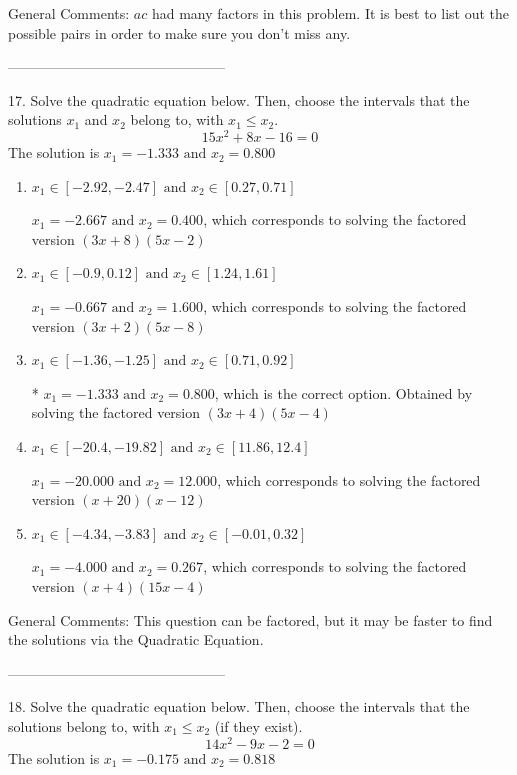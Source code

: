 \documentclass{article}[14pt]
\begin{document}
General Comments: $ac$ had many factors in this problem. It is best to list out the possible pairs in order to make sure you don't miss any.

-----------------------------------------------

17. Solve the quadratic equation below. Then, choose the intervals that the solutions $x_1$ and $x_2$ belong to, with $x_1 \leq x_2$.
$$ 15x^{2} +8 x -16 = 0 $$ 
The solution is $ x_1 = -1.333 \text{ and } x_2 = 0.800 $ 

\begin{enumerate}[label=\Alph*.] 
\item $ x_1 \in [-2.92, -2.47] \text{ and } x_2 \in [0.27, 0.71] $ 

 $x_1 = -2.667 \text{ and } x_2 = 0.400$, which corresponds to solving the factored version $(3x + 8)(5x -2)$ 
\item $ x_1 \in [-0.9, 0.12] \text{ and } x_2 \in [1.24, 1.61] $ 

 $x_1 = -0.667 \text{ and } x_2 = 1.600$, which corresponds to solving the factored version $(3x + 2)(5x -8)$ 
\item $ x_1 \in [-1.36, -1.25] \text{ and } x_2 \in [0.71, 0.92] $ 

 * $x_1 = -1.333 \text{ and } x_2 = 0.800$, which is the correct option. Obtained by solving the factored version $(3x + 4)(5x -4)$ 
\item $ x_1 \in [-20.4, -19.82] \text{ and } x_2 \in [11.86, 12.4] $ 

 $x_1 = -20.000 \text{ and } x_2 = 12.000$, which corresponds to solving the factored version $(x + 20)(x -12)$ 
\item $ x_1 \in [-4.34, -3.83] \text{ and } x_2 \in [-0.01, 0.32] $ 

 $x_1 = -4.000 \text{ and } x_2 = 0.267$, which corresponds to solving the factored version $(x + 4)(15x -4)$ 
\end{enumerate} 
 
General Comments: This question can be factored, but it may be faster to find the solutions via the Quadratic Equation.

-----------------------------------------------

18. Solve the quadratic equation below. Then, choose the intervals that the solutions belong to, with $x_1 \leq x_2$ (if they exist).
$$ 14x^{2} -9 x -2 = 0 $$ 
The solution is $ x_1 = -0.175 \text{ and } x_2 = 0.818 $ 
\end{document}
